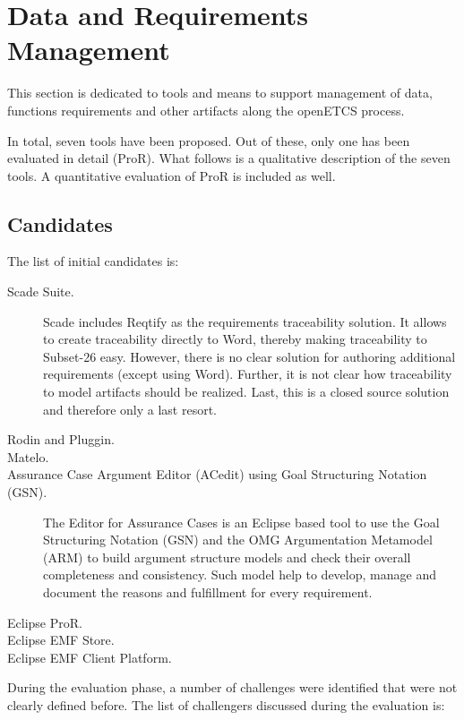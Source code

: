

\chapter{Data and Requirements Management}
\label{sec:management}

 
This section is dedicated to tools and means to support management of data, functions requirements and other artifacts along  the openETCS process.

In total, seven tools have been proposed.  Out of these, only one has been evaluated in detail (ProR).  What follows is a qualitative description of the seven tools.  A quantitative evaluation of ProR is included as well.

\section{Candidates}
The list of initial candidates is:

\begin{description}
\item[Scade Suite.]  Scade includes Reqtify as the requirements traceability solution.  It allows to create traceability directly to Word, thereby making traceability to Subset-26 easy.  However, there is no clear solution for authoring additional requirements (except using Word).  Further, it is not clear how traceability to model artifacts should be realized.  Last, this is a closed source solution and therefore only a last resort.
\item[Rodin and Pluggin.]
\item[Matelo.]
\item[Assurance Case Argument Editor (ACedit) using Goal Structuring Notation (GSN).] The Editor for Assurance Cases is an Eclipse based tool to use the Goal Structuring Notation (GSN) and the OMG Argumentation Metamodel (ARM) to build argument structure models and check their overall completeness and consistency. Such model help to develop, manage and document the reasons and fulfillment for every requirement.
\item[Eclipse ProR.]
\item[Eclipse EMF Store.]
\item[Eclipse EMF Client Platform.]
\end{description}


During the evaluation phase, a number of challenges were identified that were not clearly defined before.
The list of challengers discussed during the evaluation is:

